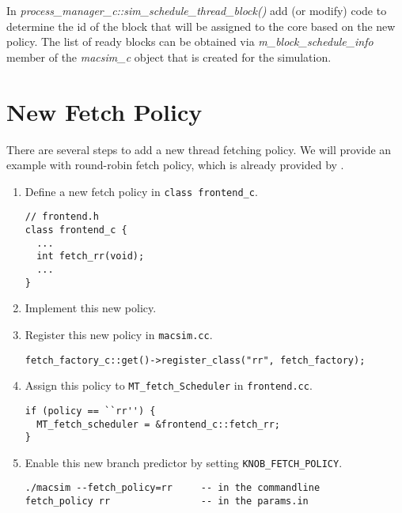 In \textit{process\_manager\_c::sim\_schedule\_thread\_block()} add (or modify)
code to determine the id of the block that will be assigned to the core based
on the new policy. The list of ready blocks can be obtained via
\textit{m\_block\_schedule\_info} member of the \textit{macsim\_c} object that
is created for the simulation.

\section{New Fetch Policy}
\label{sec:modify:fetch}

There are several steps to add a new thread fetching policy. We will
provide an example with round-robin fetch policy, which is already
provided by \SIM.

\begin{enumerate}[Step 1.]
\item Define a new fetch policy in \Verb+class frontend_c+.
\begin{Verbatim}
// frontend.h
class frontend_c {
  ...
  int fetch_rr(void);
  ...
}
\end{Verbatim}

\item Implement this new policy.

\item Register this new policy in \Verb+macsim.cc+.
\begin{Verbatim}
fetch_factory_c::get()->register_class("rr", fetch_factory);
\end{Verbatim}


\item Assign this policy to \Verb+MT_fetch_Scheduler+ in \Verb+frontend.cc+.
\begin{Verbatim}
if (policy == ``rr'') {
  MT_fetch_scheduler = &frontend_c::fetch_rr;
}
\end{Verbatim}

\item Enable this new branch predictor by setting \Verb+KNOB_FETCH_POLICY+.
\begin{Verbatim}
./macsim --fetch_policy=rr     -- in the commandline
fetch_policy rr                -- in the params.in
\end{Verbatim}
\end{enumerate}


